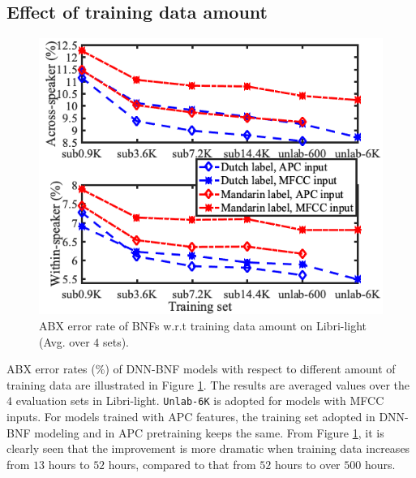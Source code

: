 \documentclass[a4paper]{article}
\begin{document}

\subsection{Effect of  training data amount}
\begin{figure}[!t]
    \centering
    \includegraphics[width=0.75\linewidth]{LaTeX/crsling_dnn_bnf_apc_input_vert.png}
    \caption{ABX error rate of BNFs w.r.t training data amount on Libri-light (Avg. over $4$ sets).}
    \label{fig:dnn_bnf_data_amount}
\end{figure}
ABX error rates ($\%$) of  DNN-BNF models with respect to different amount of training data are illustrated in Figure \ref{fig:dnn_bnf_data_amount}. The results are averaged values over the $4$ evaluation sets in  Libri-light. \texttt{Unlab-6K}  is  adopted for models with MFCC inputs. For models trained with APC features, the training set adopted in DNN-BNF modeling and in APC pretraining keeps the same. From Figure \ref{fig:dnn_bnf_data_amount}, it is clearly seen that 
the improvement is more dramatic when training data increases from $13$ hours to $52$ hours, compared to   that from $52$ hours to over $500$ hours. 
\end{document}
